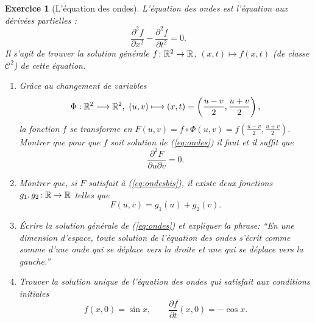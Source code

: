 \documentclass[11pt,a4paper]{article}
\theoremstyle{exostyle}
\newtheorem{exo}{Exercice}
\newcommand{\exercice}[1]{} \newcommand{\finexercice}{}
\newcommand{\enonce}{\begin{exo}} \newcommand{\finenonce}{\end{exo}}
\newcommand{\noindication}{\stepcounter{ind}}
\begin{document}
\exercice{2640, debievre, 2009/05/19}
\enonce[L'équation des ondes]
L'équation des ondes est l'équation aux dérivées partielles :
\begin{equation}\label{eq:ondes}
	\frac{\partial^2 f}{\partial x^2}-\frac{\partial^2 f}{\partial t^2}=0.
\end{equation}
Il s'agit de trouver la solution générale 
$f\colon\mathbb{R}^2\to\mathbb{R}$, $(x,t) \mapsto f(x,t)$ (de classe $\mathcal{C}^2$) de cette équation.

\begin{enumerate}
	\item Grâce au changement de variables
	\[
	\Phi : \mathbb{R}^2 \longrightarrow \mathbb{R}^2,
	\ (u,v) \longmapsto (x,t)=\left(\frac{u-v}{2}, \frac{u+v}{2}\right),
	\]
	la fonction $f$ se transforme en 
	$F(u,v)= f \circ \Phi(u,v) = f(\frac{u-v}{2}, \frac{u+v}{2})$.
	Montrer que pour que $f$ soit solution de (\ref{eq:ondes}) 
	il faut et il suffit que
	\begin{equation}\label{eq:ondesbis}
		\frac{\partial^2F}{\partial u\partial v}=0 .
	\end{equation}


    \item Montrer que, si $F$ satisfait \`a (\ref{eq:ondesbis}), il existe deux fonctions $g_1,g_2\colon\mathbb{R}\to\mathbb{R}$ telles que
    \[
    F(u,v)=g_1(u)+g_2(v).
    \]
    
    \item  \'Ecrire la solution générale de (\ref{eq:ondes}) et expliquer la phrase: ``En une dimension d'espace, toute solution de l'équation des ondes s'écrit comme somme d'une onde qui se déplace vers la droite et une qui se déplace vers la gauche.''

	\item Trouver la solution unique de l'équation des ondes qui
satisfait aux conditions initiales
\begin{equation}
	f(x,0)=\sin x, \qquad \frac{\partial f}{\partial t}(x,0)=-\cos x.
	\label{in}
\end{equation}

\end{enumerate}

\finenonce

\noindication
\end{document}
